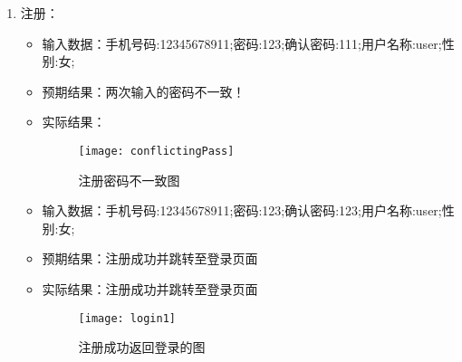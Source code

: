 \begin{enumerate}
\item{注册}：

\begin{itemize}
\item{输入数据}：手机号码:12345678911;密码:123;确认密码:111;用户名称:user;性别:女;
\item {预期结果}：两次输入的密码不一致！
\item {实际结果}：
\begin{figure}[htbp]
\centering
\texttt{[image: conflictingPass]}
\caption{注册密码不一致图}\label{fig:conflictingPass}
\end{figure}

\item{输入数据}：手机号码:12345678911;密码:123;确认密码:123;用户名称:user;性别:女;
\item {预期结果}：注册成功并跳转至登录页面
\item {实际结果}：注册成功并跳转至登录页面
\begin{figure}[htbp]
\centering
\texttt{[image: login1]}
\caption{注册成功返回登录的图}\label{fig:login1}
\end{figure}


\end{itemize}
\end{enumerate}
